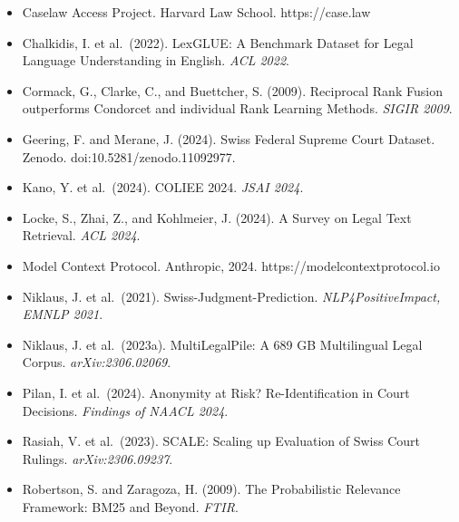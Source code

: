 \documentclass[
  11pt,
]{article}
\providecommand{\tightlist}{%
  \setlength{\itemsep}{0pt}\setlength{\parskip}{0pt}}
\begin{document}
\begin{itemize}
\tightlist
\item
  Caselaw Access Project. Harvard Law School. https://case.law
\item
  Chalkidis, I. et al.~(2022). LexGLUE: A Benchmark Dataset for Legal
  Language Understanding in English. \emph{ACL 2022}.
\item
  Cormack, G., Clarke, C., and Buettcher, S. (2009). Reciprocal Rank
  Fusion outperforms Condorcet and individual Rank Learning Methods.
  \emph{SIGIR 2009}.
\item
  Geering, F. and Merane, J. (2024). Swiss Federal Supreme Court
  Dataset. Zenodo. doi:10.5281/zenodo.11092977.
\item
  Kano, Y. et al.~(2024). COLIEE 2024. \emph{JSAI 2024}.
\item
  Locke, S., Zhai, Z., and Kohlmeier, J. (2024). A Survey on Legal Text
  Retrieval. \emph{ACL 2024}.
\item
  Model Context Protocol. Anthropic, 2024.
  https://modelcontextprotocol.io
\item
  Niklaus, J. et al.~(2021). Swiss-Judgment-Prediction.
  \emph{NLP4PositiveImpact, EMNLP 2021}.
\item
  Niklaus, J. et al.~(2023a). MultiLegalPile: A 689 GB Multilingual
  Legal Corpus. \emph{arXiv:2306.02069}.
\item
  Pilan, I. et al.~(2024). Anonymity at Risk? Re-Identification in Court
  Decisions. \emph{Findings of NAACL 2024}.
\item
  Rasiah, V. et al.~(2023). SCALE: Scaling up Evaluation of Swiss Court
  Rulings. \emph{arXiv:2306.09237}.
\item
  Robertson, S. and Zaragoza, H. (2009). The Probabilistic Relevance
  Framework: BM25 and Beyond. \emph{FTIR}.
\end{itemize}
\end{document}
